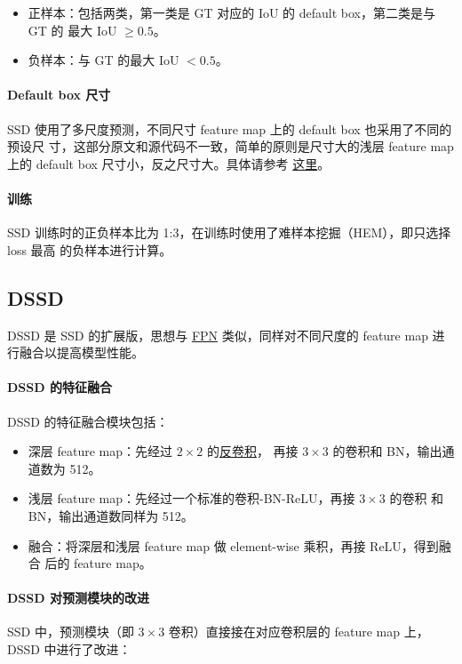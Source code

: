 \begin{itemize}
\item 正样本：包括两类，第一类是 GT 对应的 IoU 的 default box，第二类是与 GT 的
  最大 IoU $ \geq 0.5 $。 
\item 负样本：与 GT 的最大 IoU $ < 0.5 $。
\end{itemize}

\paragraph{Default box 尺寸} 
SSD 使用了多尺度预测，不同尺寸 feature map 上的 default box 也采用了不同的预设尺
寸，这部分原文和源代码不一致，简单的原则是尺寸大的浅层 feature map 上的 default
box 尺寸小，反之尺寸大。具体请参考
\href{https://github.com/weiliu89/caffe/blob/ssd/examples/ssd/ssd_pascal.py}{这里}。

\paragraph{训练} 
SSD 训练时的正负样本比为 1:3，在训练时使用了难样本挖掘（HEM），即只选择 loss 最高
的负样本进行计算。

\subsection{DSSD}
\label{subsec:DSSD}

DSSD 是 SSD 的扩展版，思想与 \hyperref[sec:FPN]{FPN} 类似，同样对不同尺度的
feature map 进行融合以提高模型性能。

\paragraph{DSSD 的特征融合}
DSSD 的特征融合模块包括：

\begin{itemize}
  \item 深层 feature map：先经过 $2 \times 2$ 的\hyperref[subsec:deconv]{反卷积}，
    再接 $3 \times 3$ 的卷积和 BN，输出通道数为 512。
  \item 浅层 feature map：先经过一个标准的卷积-BN-ReLU，再接 $3 \times 3$ 的卷积
    和 BN，输出通道数同样为 512。
  \item 融合：将深层和浅层 feature map 做 element-wise 乘积，再接 ReLU，得到融合
    后的 feature map。
\end{itemize}

\paragraph{DSSD 对预测模块的改进}
SSD 中，预测模块（即 $3 \times 3$ 卷积）直接接在对应卷积层的 feature map 上，
DSSD 中进行了改进：

